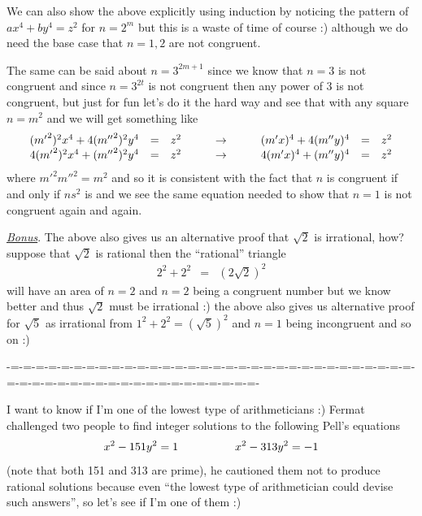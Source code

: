 \documentclass[aps,preprint,preprintnumbers,nofootinbib,showpacs,prd]{revtex4-1}
\newcommand{\nbea}{\begin{eqnarray*}}
\newcommand{\neea}{\end{eqnarray*}}
\begin{document}
We can also show the above explicitly using induction by noticing the pattern of $ax^4 + by^4 = z^2$ for $n=2^m$ but this is a waste of time of course :) although we do need the base case that $n=1,2$ are not congruent.

The same can be said about $n=3^{2m+1}$ since we know that $n=3$ is not congruent and since $n=3^{2t}$ is not congruent then any power of 3 is not congruent, but just for fun let's do it the hard way and see that with any square  $n=m^2$ and we will get something like
%
\nbea
\begin{array}{r c l c r c l}
({m'}^2)^2x^4 + 4({m''}^2)^2 y^4 & = & z^2 &~~~~~~\to~~~~~~& (m'x)^4 + 4(m'' y)^4 & = & z^2\\
4({m'}^2)^2x^4 + ({m''}^2)^2 y^4 & = & z^2 &~~~~~~\to~~~~~~& 4(m'x)^4 + (m'' y)^4 & = & z^2
\end{array}
\neea
%
where ${m'}^2{m''}^2 = m^2$ and so it is consistent with the fact that $n$ is congruent if and only if $ns^2$ is and we see the same equation needed to show that $n=1$ is not congruent again and again.

\underline{\textit{Bonus}}. The above also gives us an alternative proof that $\sqrt{2}$ is irrational, how? suppose that $\sqrt{2}$ is rational then the ``rational'' triangle
%
\nbea
2^2 + 2^2 & = & \left(2\sqrt{2}\right)^2
\neea
%
will have an area of $n=2$ and $n=2$ being a congruent number but we know better and thus $\sqrt{2}$ must be irrational :) the above also gives us alternative proof for $\sqrt{5}$ as irrational from $1^2 + 2^2 = \left(\sqrt{5}\right)^2$ and $n=1$ being incongruent and so on :)


-=-=-=-=-=-=-=-=-=-=-=-=-=-=-=-=-=-=-=-=-=-=-=-=-=-=-=-=-=-=-=-=-=-=-=-=-=-=-=-=-=-=-=-=-=-=-=-=-=-=-=-=-


I want to know if I'm one of the lowest type of arithmeticians :) Fermat challenged two people to find integer solutions to the following Pell's equations
%
\nbea
x^2 - 151 y^2 = 1 & ~~~~~~{\rm}~~~~~~& x^2 - 313 y^2 = -1
\neea
%
(note that both 151 and 313 are prime), he cautioned them not to produce rational solutions because even ``the lowest type of arithmetician could devise such answers'', so let's see if I'm one of them :)
\end{document}
